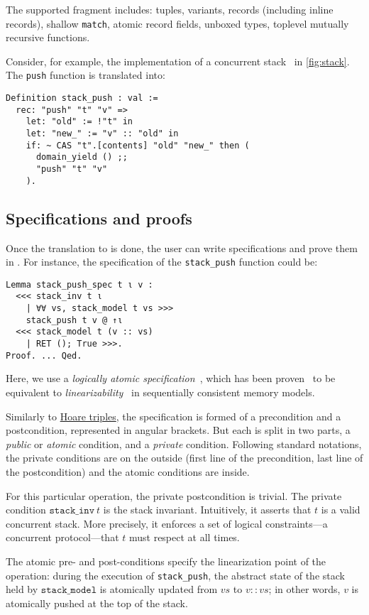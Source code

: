 The supported \OCaml fragment includes: tuples, variants, records (including inline records), shallow \texttt{match}, atomic record fields, unboxed types, toplevel mutually recursive functions.

Consider, for example, the \OCaml implementation of a concurrent stack~\cite{thomas1986systems} in \cref{fig:stack}.
The \texttt{push} function is translated into:

\begin{verbatim}
Definition stack_push : val :=
  rec: "push" "t" "v" =>
    let: "old" := !"t" in
    let: "new_" := "v" :: "old" in
    if: ~ CAS "t".[contents] "old" "new_" then (
      domain_yield () ;;
      "push" "t" "v"
    ).
\end{verbatim}

\subsection{Specifications and proofs}

Once the translation to \ZooLang is done, the user can write specifications and prove them in \Iris.
For instance, the specification of the \texttt{stack_push} function could be:

\begin{verbatim}
Lemma stack_push_spec t ι v :
  <<< stack_inv t ι
    | ∀∀ vs, stack_model t vs >>>
    stack_push t v @ ↑ι
  <<< stack_model t (v :: vs)
    | RET (); True >>>.
Proof. ... Qed.
\end{verbatim}

Here, we use a \emph{logically atomic specification}~\cite{DBLP:conf/ecoop/PintoDG14}, which has been proven~\cite{DBLP:journals/pacmpl/BirkedalDGJST21} to be equivalent to \emph{linearizability}~\cite{DBLP:journals/toplas/HerlihyW90} in sequentially consistent memory models.

Similarly to \href{https://en.wikipedia.org/wiki/Hoare_logic}{Hoare triples},
the specification is formed of a precondition and a postcondition, represented in angular brackets.
But each is split in two parts, a \emph{public} or \emph{atomic} condition, and a \emph{private} condition.
Following standard \Iris notations, the private conditions are on the outside (first line of the precondition, last line of the postcondition) and the atomic conditions are inside.

For this particular operation, the private postcondition is trivial.
The private condition $\mathtt{stack\_inv}\ t$ is the stack invariant.
Intuitively, it asserts that $t$ is a valid concurrent stack.
More precisely, it enforces a set of logical constraints---a concurrent protocol---that $t$ must respect at all times.

The atomic pre- and post-conditions specify the linearization point of the operation: during the execution of \texttt{stack\_push}, the abstract state of the stack held by $\mathtt{stack\_model}$ is atomically updated from $\mathit{vs}$ to $v :: \mathit{vs}$; in other words, $v$ is atomically pushed at the top of the stack.

